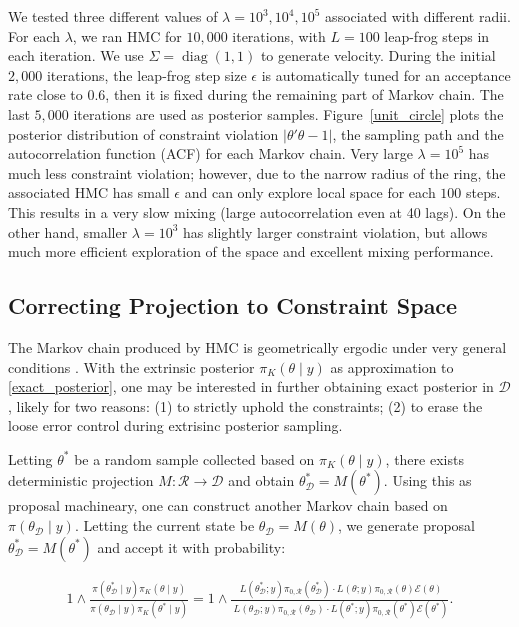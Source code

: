 \documentclass[10pt]{article}
\newcommand{\mc}[1]{\mathcal{#1}}
\DeclareMathOperator{\diag}{diag}
\begin{document}
We tested three different values of $\lambda = 10^3,10^4,10^5$  associated with different radii. For each $\lambda$, we ran HMC for $10,000$ iterations, with $L=100$ leap-frog steps in each iteration. 
We use $\Sigma= \diag(1,1)$ to generate velocity. During the initial $2,000$ iterations, the leap-frog step size $\epsilon$ is automatically tuned for an acceptance rate close to $0.6$, then it is fixed during the remaining part of Markov chain. The last $5,000$ iterations are used as posterior samples. Figure~\ref{unit_circle} plots the posterior distribution of constraint violation $|\theta'\theta -1|$, the sampling path and the autocorrelation function (ACF) for each Markov chain. Very large $\lambda=10^5$ has much less constraint violation; however, due to the narrow radius of the ring, the associated HMC has small $\epsilon$ and can only explore local space for each $100$ steps. This results in a very slow mixing (large autocorrelation even at 40 lags). On the other hand, smaller $\lambda=10^3$ has slightly larger constraint violation, but allows much more efficient exploration of the space and excellent mixing performance.




\subsection{Correcting Projection to Constraint Space}
 
The Markov chain produced by HMC is geometrically ergodic under very general conditions \citep{livingstone2016geometric}. With the extrinsic posterior $\pi_K(\theta \mid y)$ as approximation to \eqref{exact_posterior}, one may be interested in further obtaining exact posterior in $\mc D$, likely for two reasons:  (1) to strictly uphold the constraints; (2) to erase the loose error control during extrisinc posterior sampling.

Letting $\theta^*$ be a random sample collected based on $\pi_K(\theta \mid y)$, there exists deterministic projection $M: \mc R\rightarrow \mc D$ and obtain $\theta^*_{\mc D}= M(\theta^*)$. Using this as proposal machineary, one can construct another Markov chain based on $\pi(\theta_{\mc D}  \mid y)$. Letting the current state be $\theta_{\mc D} = M(\theta)$, we generate proposal $\theta^*_{\mc D}= M(\theta^*)$ and accept it with probability:

\begin{equation}
 \begin{aligned}
 1 \wedge \frac{\pi(\theta^*_{\mc D} \mid y) \pi_K(\theta  \mid y) }{\pi(\theta_{\mc D}  \mid y)\pi_K(\theta^* \mid y)} =  1 \wedge \frac{\ L(\theta^*_{\mc D};y)\pi_{0,\mc R}(\theta^*_{\mc D})  \cdot    L(\theta;y)\pi_{0,\mc R}(\theta)   \mc E(\theta)}{\ L(\theta_{\mc D};y)\pi_{0,\mc R}(\theta_{\mc D})   \cdot L(\theta^*;y)\pi_{0,\mc R}(\theta^*)   \mc E(\theta^{*})}.
 \end{aligned}
 \end{equation}
 
\end{document}
